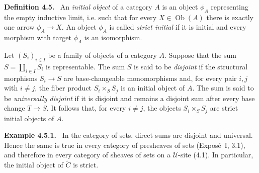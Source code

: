 \documentclass[11pt]{article}
\newcommand{\U}{\mathcal{U}}
\newcommand{\Ob}{\operatorname{Ob}}
\newenvironment{statement}[1]{\par\medskip\noindent\textbf{#1.}\ }{\par\medskip}
\newenvironment{remarktext}[1]{\par\medskip\noindent\textbf{#1.}\ }{\par\medskip}
\begin{document}
\begin{statement}{Definition 4.5}
An \emph{initial object} of a category \(A\) is an object \(\phi_A\) representing the empty inductive limit, i.e. such that for every \(X\in\Ob(A)\) there is exactly one arrow \(\phi_A\to X\). An object \(\phi_A\) is called \emph{strict initial} if it is initial and every morphism with target \(\phi_A\) is an isomorphism.

Let \((S_i)_{i\in I}\) be a family of objects of a category \(A\). Suppose that the sum \(S=\coprod_{i\in I}S_i\) is representable. The sum \(S\) is said to be \emph{disjoint} if the structural morphisms \(S_i\to S\) are base-changeable monomorphisms and, for every pair \(i,j\) with \(i\ne j\), the fiber product \(S_i\times_SS_j\) is an initial object of \(A\). The sum is said to be \emph{universally disjoint} if it is disjoint and remains a disjoint sum after every base change \(T\to S\). It follows that, for every \(i\ne j\), the objects \(S_i\times_SS_j\) are strict initial objects of \(A\).
\end{statement}

\begin{remarktext}{Example 4.5.1}
In the category of sets, direct sums are disjoint and universal. Hence the same is true in every category of presheaves of sets (Expos\'e~I, 3.1), and therefore in every category of sheaves of sets on a \(\U\)-site (4.1). In particular, the initial object of \(\widetilde C\) is strict.
\end{remarktext}
\end{document}

